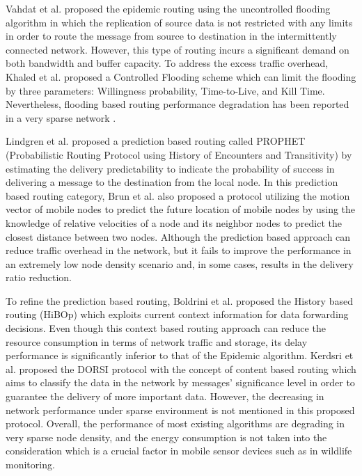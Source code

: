 Vahdat et al. \cite{Vahdat2000} proposed the epidemic routing using the uncontrolled flooding algorithm in which the replication of source data is not restricted with any limits in order to route the message from source to destination in the intermittently connected network.
However, this type of routing incurs a significant demand on both bandwidth and buffer capacity.
To address the excess traffic overhead, Khaled et al. \cite{Harras2005} proposed a Controlled Flooding  scheme which can limit the flooding by three parameters: Willingness probability, Time-to-Live, and Kill Time.
Nevertheless, flooding based routing performance degradation has been reported in a very sparse network \cite{Neena2013}.

Lindgren et al. \cite{Lindgren2003} proposed a prediction based routing called PROPHET (Probabilistic Routing Protocol using History of Encounters and Transitivity) by estimating the delivery predictability to indicate the probability of success in delivering a message to the destination from the local node.
In this prediction based routing category, Brun et al. \cite{Brendan2005}  also proposed a protocol utilizing the motion vector of mobile nodes to predict the future location of mobile nodes by using the knowledge of relative velocities of a node and its neighbor nodes to predict the closest distance between two nodes.
Although the prediction based approach can reduce traffic overhead in the network, but it fails to improve the performance in an extremely low node density scenario and, in some cases, results in the delivery ratio reduction.

To refine the prediction based routing,  Boldrini et al. \cite{Boldrini2007}  proposed the History based routing (HiBOp) which exploits current context information for data forwarding decisions.
Even though this context based routing approach can reduce the resource consumption in terms of network traffic and storage, its delay performance is significantly inferior to that of the Epidemic algorithm.
Kerdsri et al. \cite{Kerdsri2013} proposed the DORSI protocol with the concept of content based routing which aims to classify the data in the network by messages' significance level in order to guarantee the delivery of more important data. 
However, the decreasing in network performance under sparse environment is not mentioned in this proposed protocol.
Overall, the performance of most existing algorithms are degrading in very sparse node density, and the energy consumption is not taken into the consideration which is a crucial factor in mobile sensor devices such as in wildlife monitoring.

